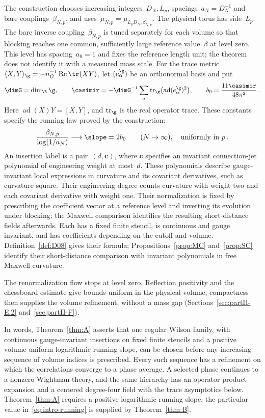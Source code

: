 The construction chooses increasing integers~$D_N,L_p$, spacings~$a_N=D_N^{-1}$ and bare couplings~$\beta_{N,p}$, and uses~$\mu_{N,p}=\mu_{L_pD_N,\beta_{N,p}}$. The physical torus has side~$L_p$. The bare inverse coupling~$\beta_{N,p}$ is tuned separately for each volume so that blocking reaches one common, sufficiently large reference value~$\bar\beta$ at level zero. This level has spacing~$a_0=1$ and fixes the reference length unit; the theorem does not identify it with a measured mass scale. For the trace metric $\langle X,Y\rangle_\g=-n_G^{-1}\operatorname{Re}\tr(XY)$, let $(e_\alpha^\g)$ be an orthonormal basis and put
\begin{equation*}
\dimG=\dim_\R\g,\qquad
\casimir=-\dimG^{-1}\sum_\alpha\operatorname{tr}_\g\bigl(\operatorname{ad}(e_\alpha^\g)^2\bigr),\qquad
b_0=\frac{11\casimir}{48\pi^2}\,.
\end{equation*}
Here $\operatorname{ad}(X)Y=[X,Y]$, and $\operatorname{tr}_\g$ is the real operator trace. These constants specify the running law proved by the construction:
\begin{equation}\label{eq:intro-running}
\frac{\beta_{N,p}}{\log(1/a_N)}\longrightarrow\slope=2b_0
\qquad(N\to\infty),\quad\text{uniformly in }p\,.
\end{equation}
An insertion label is a pair~$(d,\mathbf c)$, where $\mathbf c$ specifies an invariant connection-jet polynomial of engineering weight at most~$d$. These polynomials describe gauge-invariant local expressions in curvature and its covariant derivatives, such as curvature square. Their engineering degree counts curvature with weight two and each covariant derivative with weight one. Their normalization is fixed by prescribing the coefficient vector at a reference level and inverting its evolution under blocking; the Maxwell comparison identifies the resulting short-distance fields afterwards. Each has a fixed finite stencil, is continuous and gauge invariant, and has coefficients depending on the cutoff and volume. Definition~\ref{def:D08} gives their formula; Propositions~\ref{prop:MC} and~\ref{prop:SC} identify their short-distance comparison with invariant polynomials in free Maxwell curvature.

The renormalization flow stops at level zero. Reflection positivity and the chessboard estimate give bounds uniform in the physical volume; compactness then supplies the volume refinement, without a mass gap (Sections~\ref{sec:partII-E.2} and~\ref{sec:partII-F}).

In words, Theorem~\ref{thm:A} asserts that one regular Wilson family, with continuous gauge-invariant insertions on fixed finite stencils and a positive volume-uniform logarithmic running slope, can be chosen before any increasing sequence of volume indices is prescribed. Every such sequence has a refinement on which the correlations converge to a phase average. A selected phase continues to a nonzero Wightman theory, and the same hierarchy has an operator product expansion and a centered degree-four field with the trace asymptotics below. Theorem~\ref{thm:A} requires a positive logarithmic running slope; the particular value in~\eqref{eq:intro-running} is supplied by Theorem~\ref{thm:B}.

